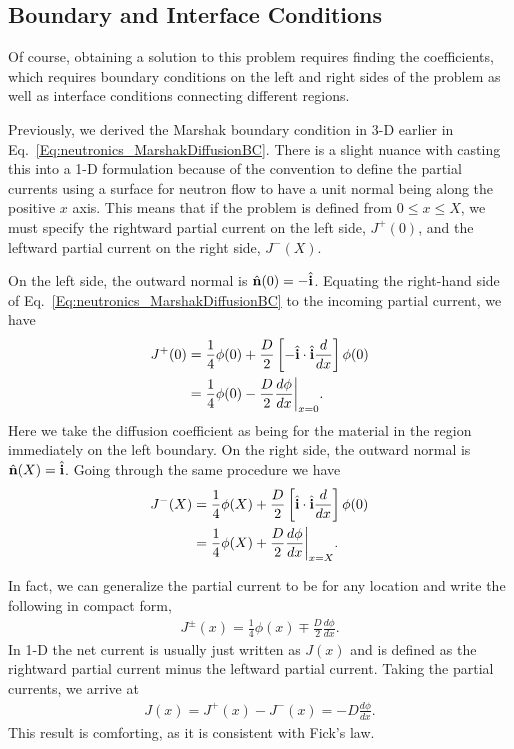 \subsection{Boundary and Interface Conditions}

Of course, obtaining a solution to this problem requires finding the coefficients, which requires boundary conditions on the left and right sides of the problem as well as interface conditions connecting different regions. 

Previously, we derived the Marshak boundary condition in 3-D earlier in Eq.~\eqref{Eq:neutronics_MarshakDiffusionBC}. There is a slight nuance with casting this into a 1-D formulation because of the convention to define the partial currents using a surface for neutron flow to have a unit normal being along the positive $x$ axis. This means that if the problem is defined from $0 \le x \le X$, we must specify the rightward partial current on the left side, $J^+(0)$, and the leftward partial current on the right side, $J^-(X)$.

On the left side, the outward normal is $\hat{\mathbf{n}}(0) = -\hat{\mathbf{i}}$. Equating the right-hand side of Eq.~\eqref{Eq:neutronics_MarshakDiffusionBC} to the incoming partial current, we have
\begin{align}
  J^+(0) 	&= \frac{1}{4} \phi(0) + \frac{D}{2} \left[ -\hat{\mathbf{i}} \cdot \hat{\mathbf{i}} \frac{d}{dx} \right] \phi(0) \nonumber \\
  			&= \frac{1}{4} \phi(0) - \frac{D}{2} \frac{d\phi}{dx} \bigg|_{x = 0} .
\end{align}
Here we take the diffusion coefficient as being for the material in the region immediately on the left boundary. On the right side, the outward normal is $\hat{\mathbf{n}}(X) = \hat{\mathbf{i}}$. Going through the same procedure we have
\begin{align}
  J^-(X) 	&= \frac{1}{4} \phi(X) + \frac{D}{2} \left[ \hat{\mathbf{i}} \cdot \hat{\mathbf{i}} \frac{d}{dx} \right] \phi(0) \nonumber \\
  			&= \frac{1}{4} \phi(X) + \frac{D}{2} \frac{d\phi}{dx} \bigg|_{x = X} .
\end{align}

In fact, we can generalize the partial current to be for any location and write the following in compact form,
\begin{align}
  J^\pm(x) = \frac{1}{4} \phi(x) \mp \frac{D}{2} \frac{d\phi}{dx} .
\end{align}
In 1-D the net current is usually just written as $J(x)$ and is defined as the rightward partial current minus the leftward partial current. Taking the partial currents, we arrive at
\begin{align}
  J(x) = J^+(x) - J^-(x) = - D \frac{d\phi}{dx}.
\end{align}
This result is comforting, as it is consistent with Fick's law.

